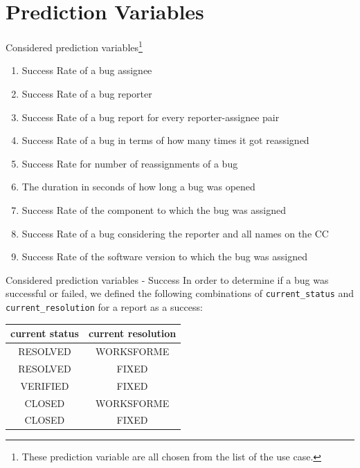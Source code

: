 \documentclass[xcolor=svgnames,handout]{beamer}
\begin{document}
\section{Prediction Variables}
\begin{frame}
  {Considered prediction variables\footnote{These prediction variable are all chosen from the list of the use case.}}

  \begin{enumerate}
      \item Success Rate of a bug assignee
      \item Success Rate of a bug reporter
      \item Success Rate of a bug report for every reporter-assignee pair
      \item Success Rate of a bug in terms of how many times it got reassigned
       \item Success Rate for number of reassignments of a bug
       \item The duration in seconds of how long a bug was opened
       \item Success Rate of the component to which the bug was assigned
       \item Success Rate of a bug considering the reporter and all names on the CC 
       \item Success Rate of the software version to which the bug was assigned
  \end{enumerate}
  
\end{frame} 

\begin{frame}{Considered prediction variables - Success}
  In order to determine if a bug was successful or failed, we defined the following combinations of \texttt{current\_status} and \texttt{current\_resolution} for a report as a success:\\
  \begin{table}[]
\centering
\begin{tabular}{cc}
\textbf{current status} & \textbf{current resolution} \\ \hline 
RESOLVED                 & WORKSFORME                   \\
RESOLVED                 & FIXED                        \\
VERIFIED                 & FIXED                        \\
CLOSED                   & WORKSFORME                   \\
CLOSED                   & FIXED    
\end{tabular}
\end{table}
\end{frame}
\end{document}

